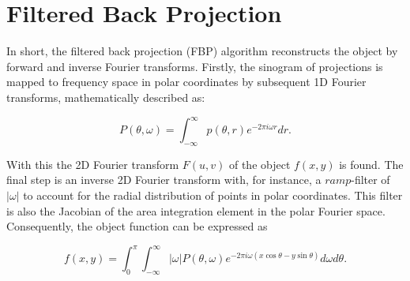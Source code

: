 \section{Filtered Back Projection}
In short, the filtered back projection (FBP) algorithm reconstructs the object by forward and inverse Fourier transforms.
Firstly, the sinogram of projections is mapped to frequency space in polar coordinates by subsequent 1D Fourier transforms, mathematically described as:

\begin{equation}\label{eq:FBP_1}
    P(\theta, \omega) = \int_{-\infty}^{\infty} p(\theta,r)e^{-2\pi i\omega r} dr.
\end{equation}

With this the 2D Fourier transform $F(u,v)$ of the object $f(x,y)$ is found.
The final step is an inverse 2D Fourier transform with, for instance, a $ramp$-filter of $|\omega|$ to account for the radial distribution of points in polar coordinates.
This filter is also the Jacobian of the area integration element in the polar Fourier space.
Consequently, the object function can be expressed as

\begin{equation}
    f(x,y) = \int_{0}^{\pi} \int_{-\infty}^{\infty} \left|\omega\right| P(\theta,\omega)e^{-2\pi i\omega (x\cos\theta - y\sin\theta)} d\omega d\theta.
\end{equation}







